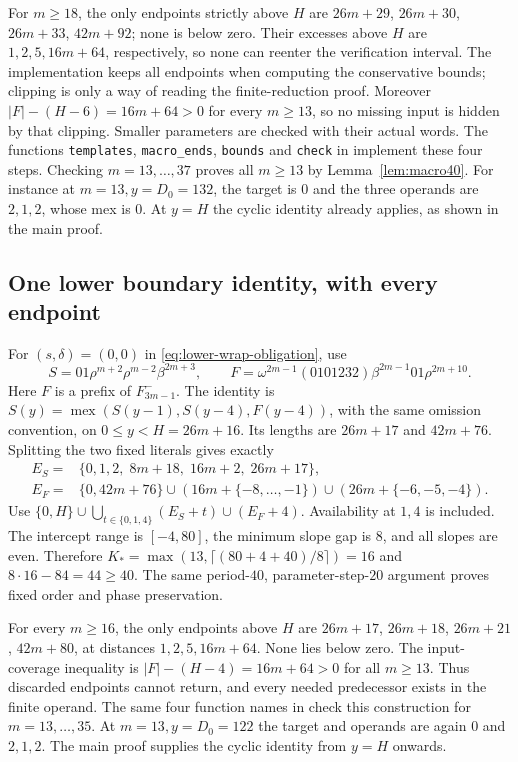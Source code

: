 \documentclass[11pt]{article}
\theoremstyle{remark}\newtheorem{remark}[theorem]{Remark}
\DeclareMathOperator{\mex}{mex}
\begin{document}
For $m\ge18$, the only endpoints strictly above $H$ are
$26m+29$, $26m+30$, $26m+33$, $42m+92$; none is below zero.
Their excesses above $H$ are $1,2,5,16m+64$, respectively, so none can
reenter the verification interval. The implementation keeps all endpoints
when computing the conservative bounds; clipping is only a way of reading
the finite-reduction proof. Moreover
$|F|-(H-6)=16m+64>0$ for every $m\ge13$, so no missing input is hidden
by that clipping. Smaller parameters are checked with their actual words.
The functions \texttt{templates}, \texttt{macro\_ends}, \texttt{bounds}
and \texttt{check} in  implement these
four steps. Checking $m=13,\ldots,37$ proves all $m\ge13$ by
Lemma~\ref{lem:macro40}. For instance at $m=13,y=D_0=132$,
the target is $0$ and the three operands are $2,1,2$, whose mex is $0$.
At $y=H$ the cyclic identity already applies, as shown in the main proof.

\subsection{One lower boundary identity, with every endpoint}
For $(s,\delta)=(0,0)$ in \eqref{eq:lower-wrap-obligation}, use
\[
S=01\rho^{m+2}\rho^{m-2}\beta^{2m+3},\qquad
F=\omega^{2m-1}(0101232)\beta^{2m-1}01\rho^{2m+10}.
\]
Here $F$ is a prefix of $F^-_{3m-1}$. The identity is
$S(y)=\mex(S(y-1),S(y-4),F(y-4))$, with the same omission convention,
on $0\le y<H=26m+16$. Its lengths are $26m+17$ and $42m+76$.
Splitting the two fixed literals gives exactly
\begin{align*}
E_S={}&\{0,1,2,\;8m+18,\;16m+2,\;26m+17\},\\
E_F={}&\{0,42m+76\}\cup(16m+\{-8,\ldots,-1\})
                    \cup(26m+\{-6,-5,-4\}).
\end{align*}
Use $\{0,H\}\cup\bigcup_{t\in\{0,1,4\}}(E_S+t)\cup(E_F+4)$.
Availability at $1,4$ is included. The intercept range is $[-4,80]$,
the minimum slope gap is $8$, and all slopes are even. Therefore
$K_*=\max(13,\lceil(80+4+40)/8\rceil)=16$ and
$8\cdot16-84=44\ge40$. The same period-$40$, parameter-step-$20$
argument proves fixed order and phase preservation.

For every $m\ge16$, the only endpoints above $H$ are
$26m+17$, $26m+18$, $26m+21$, $42m+80$, at distances
$1,2,5,16m+64$. None lies below zero. The input-coverage inequality is
$|F|-(H-4)=16m+64>0$ for all $m\ge13$. Thus discarded endpoints
cannot return, and every needed predecessor exists in the finite operand.
The same four function names in 
check this construction for $m=13,\ldots,35$. At $m=13,y=D_0=122$
the target and operands are again $0$ and $2,1,2$.
The main proof supplies the cyclic identity from $y=H$ onwards.
\end{document}
